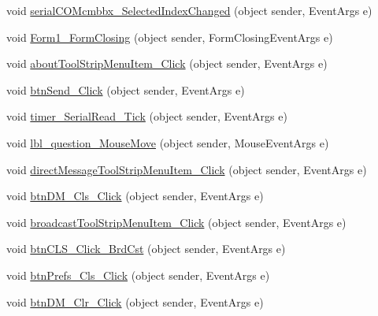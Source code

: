 \begin{DoxyCompactItemize}
\item 
void \hyperlink{class_sr_p___classroom_inq_1_1frm_classrrom_inq_aadea414ad99ecd09aa912edabf105448}{serial\-C\-O\-Mcmbbx\-\_\-\-Selected\-Index\-Changed} (object sender, \-Event\-Args e)
\item 
void \hyperlink{class_sr_p___classroom_inq_1_1frm_classrrom_inq_a6a257d6e30f5e9370c72b475aff7aafa}{\-Form1\-\_\-\-Form\-Closing} (object sender, \-Form\-Closing\-Event\-Args e)
\item 
void \hyperlink{class_sr_p___classroom_inq_1_1frm_classrrom_inq_aa814f588d2d4abeed64487cdb14fab7b}{about\-Tool\-Strip\-Menu\-Item\-\_\-\-Click} (object sender, \-Event\-Args e)
\item 
void \hyperlink{class_sr_p___classroom_inq_1_1frm_classrrom_inq_a42ab065ed95503b1313dbed6395cde09}{btn\-Send\-\_\-\-Click} (object sender, \-Event\-Args e)
\item 
void \hyperlink{class_sr_p___classroom_inq_1_1frm_classrrom_inq_a998211ade205915b4c2e1ccfff8f0243}{timer\-\_\-\-Serial\-Read\-\_\-\-Tick} (object sender, \-Event\-Args e)
\item 
void \hyperlink{class_sr_p___classroom_inq_1_1frm_classrrom_inq_a54d8d58aacb4265d0e3083f8153b0595}{lbl\-\_\-question\-\_\-\-Mouse\-Move} (object sender, \-Mouse\-Event\-Args e)
\item 
void \hyperlink{class_sr_p___classroom_inq_1_1frm_classrrom_inq_a9c1ad2d103578bed5a65f1c744124f03}{direct\-Message\-Tool\-Strip\-Menu\-Item\-\_\-\-Click} (object sender, \-Event\-Args e)
\item 
void \hyperlink{class_sr_p___classroom_inq_1_1frm_classrrom_inq_a1c2055b50c4476070c6272f0462ee640}{btn\-D\-M\-\_\-\-Cls\-\_\-\-Click} (object sender, \-Event\-Args e)
\item 
void \hyperlink{class_sr_p___classroom_inq_1_1frm_classrrom_inq_a5a5c0fb174e0ecda3389793bcb45d6e7}{broadcast\-Tool\-Strip\-Menu\-Item\-\_\-\-Click} (object sender, \-Event\-Args e)
\item 
void \hyperlink{class_sr_p___classroom_inq_1_1frm_classrrom_inq_ad06f37a98dfdb9ea7d37231cf0725836}{btn\-C\-L\-S\-\_\-\-Click\-\_\-\-Brd\-Cst} (object sender, \-Event\-Args e)
\item 
void \hyperlink{class_sr_p___classroom_inq_1_1frm_classrrom_inq_a382353840dd2e621af4b5a63ddb909fa}{btn\-Prefs\-\_\-\-Cls\-\_\-\-Click} (object sender, \-Event\-Args e)
\item 
void \hyperlink{class_sr_p___classroom_inq_1_1frm_classrrom_inq_af62b391dc8305d62127bed60356d1a77}{btn\-D\-M\-\_\-\-Clr\-\_\-\-Click} (object sender, \-Event\-Args e)

\end{DoxyCompactItemize}
